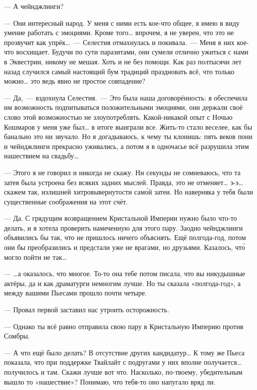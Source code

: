 \documentclass[fontsize=11pt,a5paper,titlepage=firstcover]{scrbook}
\begin{document}
--- А чейнджлинги?

--- Они интересный народ. У меня с ними есть кое-что общее, я имею в виду умение работать с эмоциями. Кроме того{\ldots} впрочем, я не уверен, что это не прозвучит как упрёк{\ldots}~--- Селестия отмахнулась и покивала.~--- Меня в них кое-что восхищает. Будучи по сути паразитами, они сумели отлично ужиться с нами в Эквестрии, никому не мешая. Хоть и не без помощи. Как раз полтысячи лет назад случился самый настоящий бум традиций праздновать всё, что только можно{\ldots} это ведь явно не простое совпадение?

--- Да,~--- вздохнула Селестия.~--- Это была наша договорённость: я обеспечила им возможность подпитываться положительными эмоциями, они держали своё слово этой возможностью не злоупотреблять. Какой-никакой опыт с Ночью Кошмаров у меня уже был{\ldots} в итоге выиграли все. Жить-то стало веселее, как бы банально это ни звучало. Но я догадываюсь, к чему ты клонишь: пять веков пони и чейнджлинги прекрасно уживались, а потом я в одночасье всё разрушила этим нашествием на свадьбу{\ldots}

--- Этого я не говорил и никогда не скажу. Ни секунды не сомневаюсь, что та затея была устроена без всяких задних мыслей. Правда, это не отменяет{\ldots} э-э{\ldots} скажем так, излишней хитровывернутости само́й затеи. Но наверняка у тебя были существенные соображения на этот счёт.

--- Да. С грядущим возвращением Кристальной Империи нужно было что-то делать, и я хотела проверить намеченную для этого пару. Заодно чейнджлинги объявились бы так, что не пришлось ничего объяснять. Ещё полгода-год, потом они бы преобразились и предстали уже не врагами, но друзьями. Казалось, что́ могло пойти не так{\ldots}

--- {\ldots}а оказалось, что многое. То-то она тебе потом писала, что вы никудышные актёры, да и как драматурги немногим лучше. Но ты сказала «полгода-год», а между вашими Пьесами прошло почти четыре.

--- Провал первой заставил нас утроить осторожность.

--- Однако ты всё равно отправила свою пару в Кристальную Империю против Сомбры.

--- А что ещё было делать? В отсутствие других кандидатур{\ldots} К тому же Пьеса показала, что при поддержке Твайлайт с подругами у них вполне получается{\ldots} получилось и там. Скажи лучше вот что. Насколько, по-твоему, убедительным вышло то «нашествие»? Понимаю, что тебя-то оно напугало вряд ли.
\end{document}
